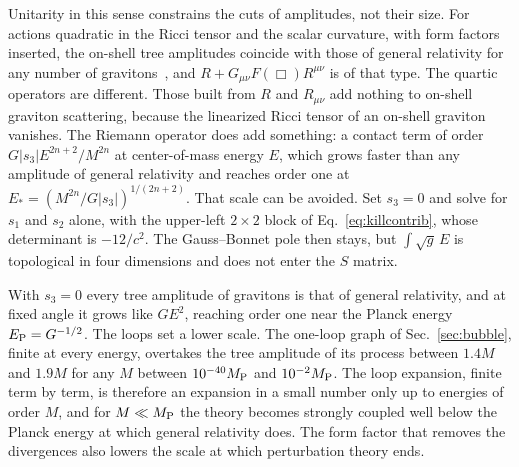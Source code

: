 \documentclass[a4paper,11pt]{article}
\begin{document}
Unitarity in this sense constrains the cuts of amplitudes, not their size. For actions quadratic in the Ricci tensor and the scalar curvature, with form factors inserted, the on-shell tree amplitudes coincide with those of general relativity for any number of gravitons~\cite{Dona2015}, and $R+G_{\mu\nu}F(\Box)R^{\mu\nu}$ is of that type. The quartic operators are different. Those built from $R$ and $R_{\mu\nu}$ add nothing to on-shell graviton scattering, because the linearized Ricci tensor of an on-shell graviton vanishes. The Riemann operator does add something: a contact term of order $G|s_3|E^{2n+2}/M^{2n}$ at center-of-mass energy $E$, which grows faster than any amplitude of general relativity and reaches order one at $E_*=(M^{2n}/G|s_3|)^{1/(2n+2)}$. That scale can be avoided. Set $s_3=0$ and solve for $s_1$ and $s_2$ alone, with the upper-left $2\times2$ block of Eq.~\eqref{eq:killcontrib}, whose determinant is $-12/c^2$. The Gauss--Bonnet pole then stays, but $\int\sqrt g\,E$ is topological in four dimensions and does not enter the $S$ matrix.

With $s_3=0$ every tree amplitude of gravitons is that of general relativity, and at fixed angle it grows like $GE^2$, reaching order one near the Planck energy $E_{\rm P}=G^{-1/2}$. The loops set a lower scale. The one-loop graph of Sec.~\ref{sec:bubble}, finite at every energy, overtakes the tree amplitude of its process between $1.4M$ and $1.9M$ for any $M$ between $10^{-40}M_{\rm P}$ and $10^{-2}M_{\rm P}$. The loop expansion, finite term by term, is therefore an expansion in a small number only up to energies of order $M$, and for $M\ll M_{\rm P}$ the theory becomes strongly coupled well below the Planck energy at which general relativity does. The form factor that removes the divergences also lowers the scale at which perturbation theory ends.
\end{document}
